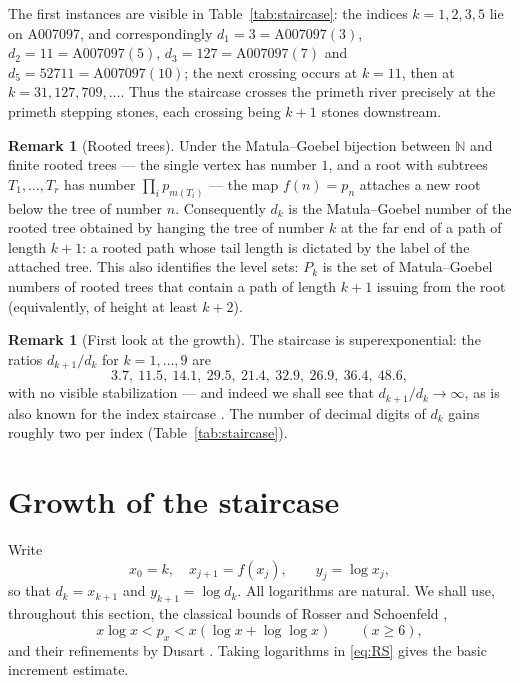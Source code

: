 \documentclass[11pt,a4paper]{article}
\theoremstyle{plain}
\theoremstyle{definition}
\newtheorem{remark}[theorem]{Remark}
\newcommand{\N}{\mathbb{N}}
\begin{document}
The first instances are visible in Table~\ref{tab:staircase}: the indices
$k=1,2,3,5$ lie on A007097, and correspondingly
$d_1=3=\mathrm{A007097}(3)$, $d_2=11=\mathrm{A007097}(5)$,
$d_3=127=\mathrm{A007097}(7)$ and $d_5=52711=\mathrm{A007097}(10)$; the
next crossing occurs at $k=11$, then at $k=31,127,709,\ldots$. Thus the
staircase crosses the primeth river precisely at the primeth stepping
stones, each crossing being $k+1$ stones downstream.

\begin{remark}[Rooted trees]\label{rem:matula}
Under the Matula--Goebel bijection between $\N$ and finite rooted trees ---
the single vertex has number $1$, and a root with subtrees $T_1,\ldots,T_r$
has number $\prod_i p_{m(T_i)}$ \cite{GutmanIvic} --- the map $f(n)=p_n$
attaches a new root below the tree of number $n$. Consequently $d_k$ is the
Matula--Goebel number of the rooted tree obtained by hanging the tree of
number $k$ at the far end of a path of length $k+1$: a rooted path whose
tail length is dictated by the label of the attached tree. This also
identifies the level sets: $P_k$ is the set of Matula--Goebel numbers of
rooted trees that contain a path of length $k+1$ issuing from the root
(equivalently, of height at least $k+2$).
\end{remark}

\begin{remark}[First look at the growth]\label{rem:firstgrowth}
The staircase is superexponential: the ratios
$d_{k+1}/d_k$ for $k=1,\ldots,9$ are
\[
  3.7,\ 11.5,\ 14.1,\ 29.5,\ 21.4,\ 32.9,\ 26.9,\ 36.4,\ 48.6,
\]
with no visible stabilization --- and indeed we shall see that
$d_{k+1}/d_k\to\infty$, as is also known for the index staircase
\cite[Theorem~7]{MiskaTothZmija}. The number of decimal digits of $d_k$
gains roughly two per index (Table~\ref{tab:staircase}).
\end{remark}

\section{Growth of the staircase}\label{sec:growth}

Write
\[
  x_0=k,\quad x_{j+1}=f(x_j),\qquad y_j=\log x_j,
\]
so that $d_k=x_{k+1}$ and $y_{k+1}=\log d_k$. All logarithms are natural. We
shall use, throughout this section, the classical bounds of Rosser and
Schoenfeld \cite{RosserSchoenfeld},
\begin{equation}\label{eq:RS}
  x\log x<p_x<x(\log x+\log\log x)\qquad(x\ge6),
\end{equation}
and their refinements by Dusart \cite{Dusert}. Taking logarithms in
\eqref{eq:RS} gives the basic increment estimate.
\end{document}
